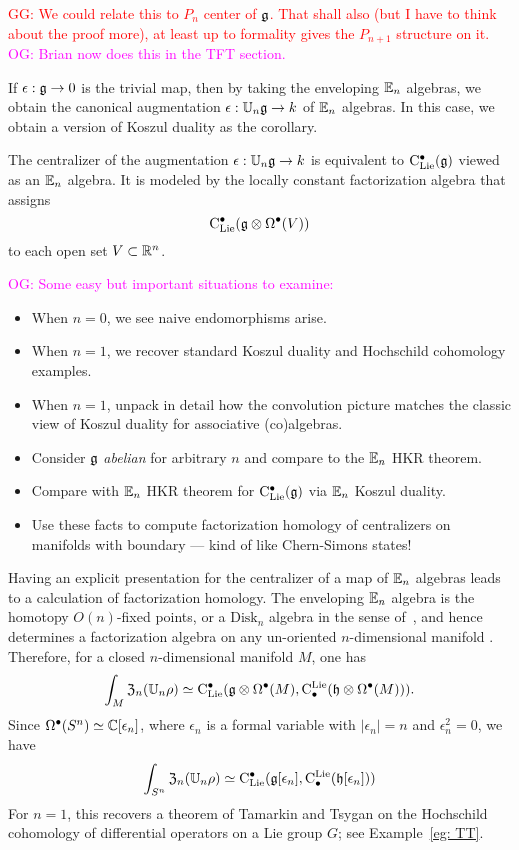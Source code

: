 \documentclass[11pt]{amsart}
\numberwithin{equation}{section}
\def\owen{\textcolor{magenta}{OG: }\textcolor{magenta}}
\def\greg{\textcolor{red}{GG: }\textcolor{red}}
\begin{document}
\greg{We could relate this to $P_n$ center of $\mathfrak g$. That shall also (but I have to think about the proof more), 
at least up to formality gives the $P_{n+1}$ structure on it. }\owen{Brian now does this in the TFT section.}

If $\epsilon: \mathfrak g \to 0$ is the trivial map, then by taking the enveloping $\mathbb E_n$ algebras, we obtain the canonical augmentation $\epsilon: \mathbb U_n \mathfrak g \to k$ of $\mathbb E_n$ algebras.
In this case, we obtain a version of Koszul duality as the corollary.

\begin{cor}
\label{thm: koszul duality}
The centralizer of the augmentation $\epsilon: \mathbb U_n \mathfrak g \to k$ is equivalent to ${\rm C}_{\rm Lie}^\bullet(\mathfrak g)$ viewed as an $\mathbb E_n$ algebra. It is modeled by the locally constant factorization algebra that assigns
\[
{\rm C}_{\rm Lie}^\bullet(\mathfrak g \otimes \Omega^\bullet(V))
\]
to each open set $V \subset \mathbb R^n$.
\end{cor}

\owen{Some easy but important situations to examine:}
\begin{itemize}
\item When $n=0$, we see naive endomorphisms arise.
\item When $n=1$, we recover standard Koszul duality and Hochschild cohomology examples.
\item When $n=1$, unpack in detail how the convolution picture matches the classic view of Koszul duality for associative (co)algebras.
\item Consider $\mathfrak g$ {\em abelian} for arbitrary $n$ and compare to the $\mathbb E_n$ HKR theorem.
\item Compare with $\mathbb E_n$ HKR theorem for ${\rm C}_{\rm Lie}^\bullet(\mathfrak g)$ via $\mathbb E_n$ Koszul duality.
\item Use these facts to compute factorization homology of centralizers on manifolds with boundary --- kind of like Chern-Simons states!
\end{itemize}

Having an explicit presentation for the centralizer of a map of $\mathbb E_n$ algebras leads to a calculation of factorization homology.
The enveloping $\mathbb E_n$ algebra is the homotopy $O(n)$-fixed points, or a $\mathrm{Disk}_n$ algebra in the sense of~\cite{AF},
and hence determines a factorization algebra on any un-oriented $n$-dimensional manifold \cite{Knudsen}.
Therefore, for a closed $n$-dimensional manifold $M$, one has
\[
\int_M {\frak Z}_n(\mathbb U_n \rho) \simeq {\rm C}_{\rm Lie}^\bullet(\mathfrak g \otimes \Omega^\bullet(M), {\rm C}^{\rm Lie}_\bullet( \mathfrak h \otimes \Omega^\bullet(M))).
\]
Since $\Omega^\bullet(S^n) \simeq \mathbb C[\epsilon_n]$, where $\epsilon_n$ is a formal variable with $|\epsilon_n| = n$ and $\epsilon_n^2 = 0$, we have
\[
\int_{S^n} {\frak Z}_n(\mathbb U_n \rho) \simeq {\rm C}_{\rm Lie}^\bullet(\mathfrak g[\epsilon_n], {\rm C}^{\rm Lie}_\bullet( \mathfrak h[\epsilon_n]))
\]
For $n=1$, this recovers a theorem of Tamarkin and Tsygan \cite{TT} on the Hochschild cohomology of differential operators on a Lie group $G$;
see Example~\ref{eg: TT}. 
\end{document}
